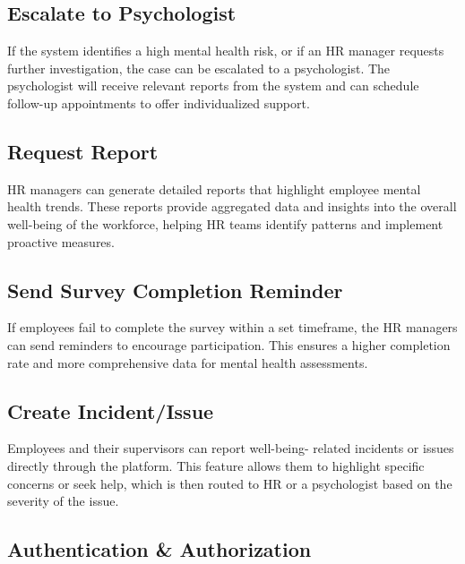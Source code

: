 \documentclass[conference]{IEEEtran}
\begin{document}
        \subsection{Escalate to Psychologist}
                    
            If the system identifies a high mental health risk, or if an
            HR manager requests further investigation, the case can be
            escalated to a psychologist. The psychologist will receive
            relevant reports from the system and can schedule follow-up
            appointments to offer individualized support.
            
        \subsection{Request Report}
                        
             HR managers can generate detailed reports that highlight
             employee mental health trends. These reports provide
             aggregated data and insights into the overall well-being of the
             workforce, helping HR teams identify patterns and implement
             proactive measures.
            
        \subsection{Send Survey Completion Reminder}
        
            If employees fail to complete the survey within a set
            timeframe, the HR managers can send reminders to encourage
            participation. This ensures a higher completion rate and more
            comprehensive data for mental health assessments.
            
        \subsection{Create Incident/Issue}
                       
            Employees and their supervisors can report well-being-
            related incidents or issues directly through the platform. This
            feature allows them to highlight specific concerns or seek
            help, which is then routed to HR or a psychologist based on
            the severity of the issue.
            
        \subsection{Authentication \& Authorization}
\end{document}

